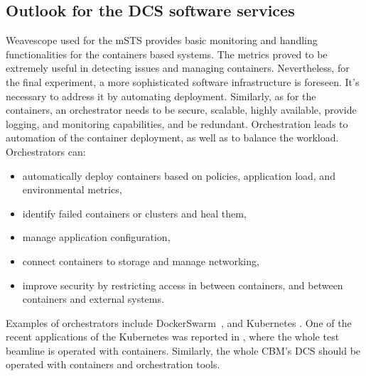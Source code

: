 \subsection{Outlook for the DCS software services} 
Weavescope used for the \gls{mSTS} provides basic monitoring and handling functionalities for the containers based systems. The metrics proved to be extremely useful in detecting issues and managing containers. Nevertheless, for the final experiment, a more sophisticated software infrastructure is foreseen. It's necessary to address it by automating deployment. Similarly, as for the containers, an orchestrator needs to be secure, scalable, highly available, provide logging, and monitoring capabilities, and be redundant. Orchestration leads to automation of the container deployment, as well as to balance the workload. Orchestrators can:
 \begin{itemize}
     \item automatically deploy containers based on policies, application load, and environmental metrics,
     \item identify failed containers or clusters and heal them,
     \item manage application configuration,
     \item connect containers to storage and manage networking,
     \item improve security by restricting access in between containers, and between containers and external systems.
 \end{itemize}

 Examples of orchestrators include DockerSwarm~\cite{DockerSwarm}, and Kubernetes \cite{Kubernetes}. One of the recent applications of the Kubernetes was reported in \cite{ICALEPCS2021:Diamond}, where the whole test beamline is operated with containers. Similarly, the whole \gls{CBM}'s \gls{DCS} should be operated with containers and orchestration tools. 

